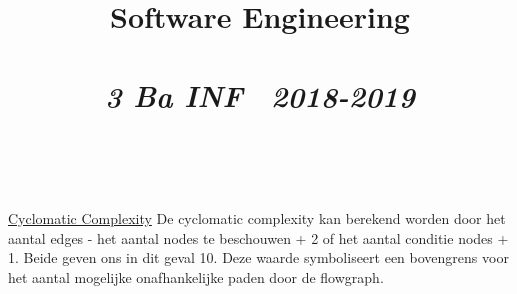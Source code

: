 \documentclass{article}
\title{\textmd{\textbf{Software Engineering}}\\\normalsize\vspace{0.1in}\Large{\assignmentname}\\\vspace{0.1in}\small{\textit{3 Ba INF \  2018-2019}}}
\author{\studentA \\ \studentB}
\begin{document}
\maketitle
\noindent
\underline{Cyclomatic Complexity}\newline
\newline
De cyclomatic complexity kan berekend worden door het aantal edges - het aantal nodes te beschouwen + 2 of het aantal conditie nodes + 1. Beide geven ons in dit geval 10. Deze waarde symboliseert een bovengrens voor het aantal mogelijke onafhankelijke paden door de flowgraph. 

\end{document}
